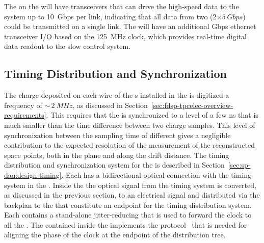 The  on the  will have transceivers that can 
drive the high-speed data to the  system up to
\SI{10}{Gbps} per link, indicating that all data from
two  (2$\times\SI{5}{Gbps}$) could be transmitted 
on a single link. The  will have an additional 
Gbps ethernet transceiver I/O based on the \SI{125}{MHz} clock, which 
provides real-time digital data readout to the slow control system.

\subsection{Timing Distribution and Synchronization}
\label{sec:fdsp-tpcelec-design-timing}

The charge deposited on each wire of the s installed 
in the   is digitized a frequency of
$\sim\,\SI{2}{MHz}$, as discussed in 
Section~\ref{sec:fdsp-tpcelec-overview-requirements}. This requires
that the  is synchronized to a level of a few ns that is
much smaller than the time difference between two charge samples.
This level of synchronization between the sampling time of different
 gives a negligible contribution to the expected
resolution of the measurement of the reconstructed space points,
both in the  plane and along the drift distance.
The timing distribution and synchronization system for the
  is described in Section~\ref{sec:sp-daq:design-timing}.
Each  has a bidirectional optical connection with the
timing system in the . Inside the  the optical
signal from the timing system is converted, as discussed in the previous
section, to an electrical signal and distributed via the backplan to
the  that constitute an endpoint for the timing distribution
system. Each  contains a stand-alone jitter-reducing  
that is used to forward the clock to all the . The
 contained inside the  implements the 
protocol~\cite{docdb-1651,docdb-11233} that is needed for aligning
the phase of the clock at the endpoint of the distribution tree.


